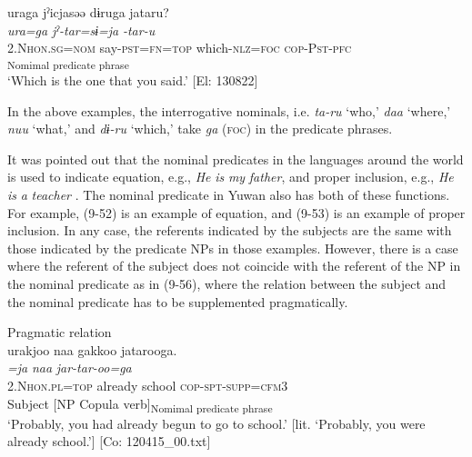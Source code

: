 \ex \label{ex:9.55d} %
    \glll uraga  jˀicjasəə  dɨruga    jataru?\\
      \textit{ura=ga}  \textit{jˀ-tar=sɨ=ja}  \textit{} \textit{-tar-u}\\
      2.N\textsc{hon}.\textsc{sg}=\textsc{nom}  say-\textsc{pst}=\textsc{fn}=\textsc{top}  which-\textsc{nlz}=\textsc{foc}  \textsc{cop}-P\textsc{st}-\textsc{pfc}\\
          [NP                                       Copula verb]\textsubscript{Nomimal predicate phrase}\\
      \glt ‘Which is the one that you said.’    [El: 130822]
    \z
\z

In the above examples, the interrogative nominals, i.e. \textit{ta-ru} ‘who,’ \textit{daa} ‘where,’ \textit{nuu} ‘what,’ and \textit{dɨ-ru} ‘which,’ take \textit{ga} (\textsc{foc}) in the predicate phrases.

It was pointed out that the nominal predicates in the languages around the world is used to indicate equation, e.g., \textit{He} \textit{is} \textit{my} \textit{father}, and proper inclusion, e.g., \textit{He} \textit{is} \textit{a} \textit{teacher} \citep[114]{Payne1997}. The nominal predicate in Yuwan also has both of these functions. For example, (9-52) is an example of equation, and (9-53) is an example of proper inclusion. In any case, the referents indicated by the subjects are the same with those indicated by the predicate NPs in those examples. However, there is a case where the referent of the subject does not coincide with the referent of the NP in the nominal predicate as in (9-56), where the relation between the subject and the nominal predicate has to be supplemented pragmatically.

\ea   Pragmatic relation \label{ex:9.56}\\
 \gllll  urakjoo  naa  gakkoo  jatarooga.\\
    \textit{=ja}  \textit{naa}  \textit{}  \textit{jar-tar-oo=ga}\\
    2.N\textsc{hon}.\textsc{pl}=\textsc{top}  already  school  \textsc{cop}-\textsc{spt}-\textsc{supp}=\textsc{cfm}3\\
    Subject    [NP  Copula verb]\textsubscript{Nomimal predicate phrase}\\
    \glt     ‘Probably, you had already begun to go to school.’ [lit. ‘Probably, you were already school.’] [Co: 120415\_00.txt]
\z

